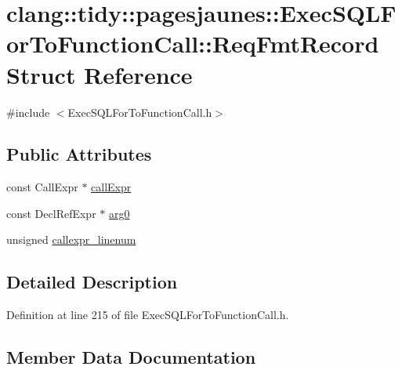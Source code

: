 \hypertarget{structclang_1_1tidy_1_1pagesjaunes_1_1_exec_s_q_l_for_to_function_call_1_1_req_fmt_record}{}\section{clang\+:\+:tidy\+:\+:pagesjaunes\+:\+:Exec\+S\+Q\+L\+For\+To\+Function\+Call\+:\+:Req\+Fmt\+Record Struct Reference}
\label{structclang_1_1tidy_1_1pagesjaunes_1_1_exec_s_q_l_for_to_function_call_1_1_req_fmt_record}


{\ttfamily \#include $<$Exec\+S\+Q\+L\+For\+To\+Function\+Call.\+h$>$}

\subsection*{Public Attributes}
\begin{DoxyCompactItemize}
\item 
const Call\+Expr $\ast$ \hyperlink{structclang_1_1tidy_1_1pagesjaunes_1_1_exec_s_q_l_for_to_function_call_1_1_req_fmt_record_a775bf2c947527bcd7ba4e834f731a7f8}{call\+Expr}
\item 
const Decl\+Ref\+Expr $\ast$ \hyperlink{structclang_1_1tidy_1_1pagesjaunes_1_1_exec_s_q_l_for_to_function_call_1_1_req_fmt_record_aa421eae0c6a8d1a89f46b375bc1258f0}{arg0}
\item 
unsigned \hyperlink{structclang_1_1tidy_1_1pagesjaunes_1_1_exec_s_q_l_for_to_function_call_1_1_req_fmt_record_aad97c4c186e57623d0a25e3499a93d19}{callexpr\+\_\+linenum}
\end{DoxyCompactItemize}


\subsection{Detailed Description}


Definition at line 215 of file Exec\+S\+Q\+L\+For\+To\+Function\+Call.\+h.



\subsection{Member Data Documentation}
\mbox{\label{structclang_1_1tidy_1_1pagesjaunes_1_1_exec_s_q_l_for_to_function_call_1_1_req_fmt_record_aa421eae0c6a8d1a89f46b375bc1258f0}} 
